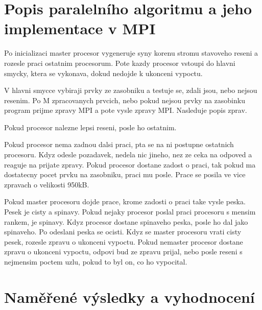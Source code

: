 \documentclass[12pt]{article}
\begin{document}
\section{Popis paralelního algoritmu a jeho implementace v MPI}

Po inicializaci master procesor vygeneruje syny korenu stromu stavoveho reseni a rozesle praci ostatnim procesorum. Pote kazdy procesor vstoupi do hlavni smycky, ktera se vykonava, dokud nedojde k ukonceni vypoctu.

V hlavni smycce vybiraji prvky ze zasobniku a testuje se, zdali jsou, nebo nejsou resenim. Po M zpracovanych prvcich, nebo pokud nejsou prvky na zasobinku program prijme zpravy MPI a pote vysle zpravy MPI. Nasleduje popis zprav.

Pokud procesor nalezne lepsi reseni, posle ho ostatnim.

Pokud procesor nema zadnou dalsi praci, pta se na ni postupne ostatnich procesoru. Kdyz odesle pozadavek, nedela nic jineho, nez ze ceka na odpoved a reaguje na prijate zpravy. Pokud procesor dostane zadost o praci, tak pokud ma dostatecny pocet prvku na zasobniku, praci mu posle. Prace se posila ve vice zpravach o velikosti 950kB.

Pokud master procesoru dojde prace, krome zadosti o praci take vysle peska. Pesek je cisty a spinavy. Pokud nejaky procesor poslal praci procesoru s mensim rankem, je spinavy. Kdyz procesor dostane spinaveho peska, posle ho dal jako spinaveho. Po odeslani peska se ocisti. Kdyz se master procesoru vrati cisty pesek, rozesle zpravu o ukonceni vypoctu. Pokud nemaster procesor dostane zpravu o ukonceni vypoctu, odpovi bud ze zpravu prijal, nebo posle reseni s nejmensim poctem uzlu, pokud to byl on, co ho vypocital.


\section{Naměřené výsledky a vyhodnocení}
\end{document}
